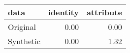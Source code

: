 \begin{tabular}{lrr}
  \toprule
data & identity & attribute \\ 
  \midrule
Original & 0.00 & 0.00 \\ 
  Synthetic & 0.00 & 1.32 \\ 
   \bottomrule
\end{tabular}
